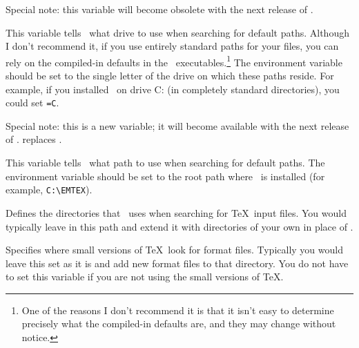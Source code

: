 \begin{iplist}[\textnormal]{.25in}

  Special note: this variable will become obsolete with the next
  release of \emTeX.

  This variable tells \emTeX\ what drive to use when searching for
  default paths.  Although I don't recommend it, if you use entirely
  standard paths for your files, you can rely on the compiled-in
  defaults in the \emTeX\ executables.\footnote{One of the reasons I
  don't recommend it is that it isn't easy to determine precisely what
  the compiled-in defaults are, and they may change without notice.}
  The  environment variable should be set to the single
  letter of the drive on which these paths reside.  For example, if
  you installed \emTeX\ on drive C: (in completely standard directories),
  you could set \texttt{=C}.


  Special note: this is a new variable; it will become available with
  the next release of \emTeX.   replaces .

  This variable tells \emTeX\ what path to use when searching for
  default paths.
  The  environment variable should be set to the root
  path where \emTeX\ is installed (for example, \verb|C:\EMTEX|).


  Defines the directories that \emTeX\ uses when searching for \TeX\
  input files.  You would typically leave 
  in this path and extend it with directories of your own in place
  of \filename{C:{\bs}MYTEX}.


  Specifies where small versions of \TeX\ look for format files.  Typically
  you would leave this set as it is and add new format files to that directory.
  You do not have to set this variable if you are not using the small
  versions of \TeX.

\newpage


\end{iplist}

